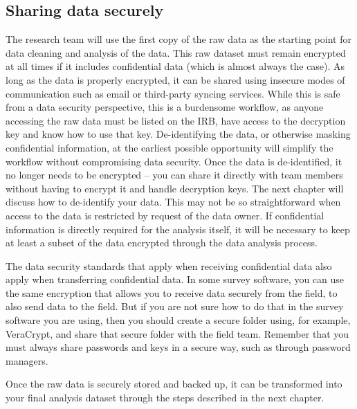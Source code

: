 \subsection{Sharing data securely}
The research team will use the first copy of the raw data
as the starting point for data cleaning and analysis of the data.
This raw dataset must remain encrypted at all times if it includes confidential data
 (which is almost always the case).
As long as the data is properly encrypted,
it can be shared using insecure modes of communication
such as email or third-party syncing services.
While this is safe from a data security perspective,
this is a burdensome workflow, as anyone accessing the raw data must be listed on the IRB,
have access to the decryption key and know how to use that key.
De-identifying the data, or otherwise masking confidential information,
at the earliest possible opportunity will simplify the workflow without compromising data security.
Once the data is de-identified, it no longer needs to be encrypted --
you can share it directly with team members 
without having to encrypt it and handle decryption keys.
The next chapter will discuss how to de-identify your data.
This may not be so straightforward when access to the data
is restricted by request of the data owner.
If confidential information is directly required for the analysis itself,
it will be necessary to keep at least a subset of the data encrypted through the data analysis process.

The data security standards that apply when receiving confidential data also apply when transferring confidential data.
In some survey software, you can use the same encryption that allows you to receive data securely
from the field, to also send data to the field.
But if you are not sure how to do that in the survey software you are using,
then you should create a secure folder using, for example,
VeraCrypt, and share that secure folder with the field team.
Remember that you must always share passwords and keys in a secure way,
such as through password managers.

Once the raw data is securely stored and backed up, 
it can be transformed into your final analysis dataset
through the steps described in the next chapter.
